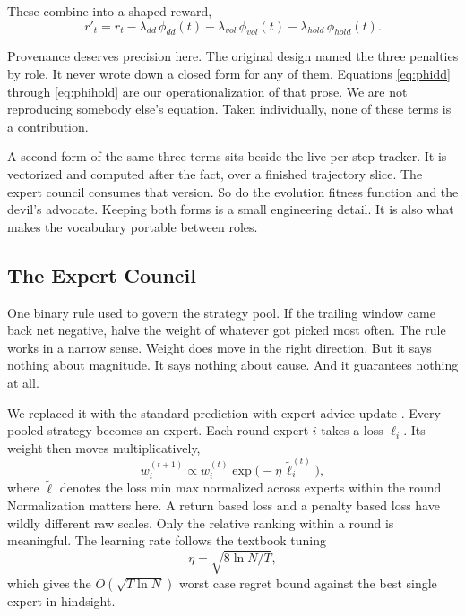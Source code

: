 \documentclass[conference]{IEEEtran}
\begin{document}
These combine into a shaped reward,
\begin{equation}
r'_t = r_t - \lambda_{dd}\,\phi_{dd}(t) - \lambda_{vol}\,\phi_{vol}(t) - \lambda_{hold}\,\phi_{hold}(t).
\label{eq:shaped}
\end{equation}

Provenance deserves precision here. The original design named the three penalties by role. It never wrote down a closed form for any of them. Equations \ref{eq:phidd} through \ref{eq:phihold} are our operationalization of that prose. We are not reproducing somebody else's equation. Taken individually, none of these terms is a contribution.

A second form of the same three terms sits beside the live per step tracker. It is vectorized and computed after the fact, over a finished trajectory slice. The expert council consumes that version. So do the evolution fitness function and the devil's advocate. Keeping both forms is a small engineering detail. It is also what makes the vocabulary portable between roles.

\subsection{The Expert Council}
\label{sec:council}

One binary rule used to govern the strategy pool. If the trailing window came back net negative, halve the weight of whatever got picked most often. The rule works in a narrow sense. Weight does move in the right direction. But it says nothing about magnitude. It says nothing about cause. And it guarantees nothing at all.

We replaced it with the standard prediction with expert advice update \cite{freund1997decision,cesabianchi2006prediction}. Every pooled strategy becomes an expert. Each round expert $i$ takes a loss $\ell_i$. Its weight then moves multiplicatively,
\begin{equation}
w_i^{(t+1)} \propto w_i^{(t)} \exp\!\big(-\eta\,\tilde{\ell}_i^{(t)}\big),
\label{eq:hedge}
\end{equation}
where $\tilde{\ell}$ denotes the loss min max normalized across experts within the round. Normalization matters here. A return based loss and a penalty based loss have wildly different raw scales. Only the relative ranking within a round is meaningful. The learning rate follows the textbook tuning
\begin{equation}
\eta = \sqrt{8 \ln N / T},
\label{eq:eta}
\end{equation}
which gives the $O(\sqrt{T \ln N})$ worst case regret bound against the best single expert in hindsight.
\end{document}
